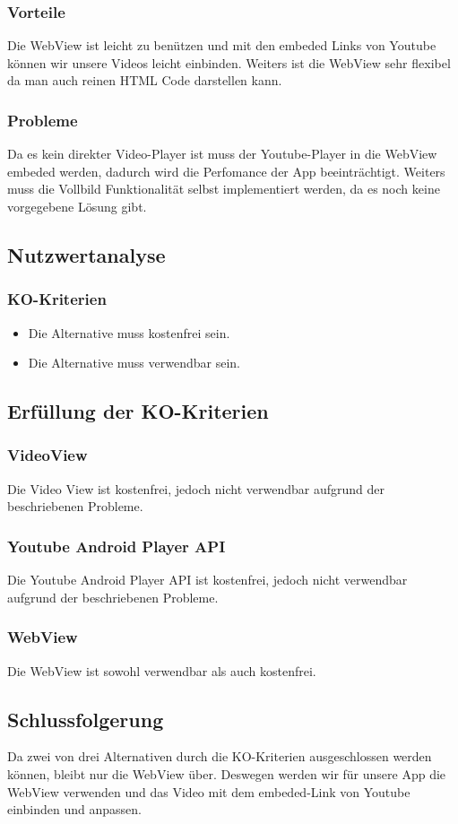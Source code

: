 \documentclass[FIPLY_base.tex]{subfiles}
\begin{document}
\subsubsection{Vorteile}
Die WebView ist leicht zu benützen und mit den embeded Links von Youtube können wir unsere Videos leicht einbinden. Weiters ist die WebView sehr flexibel da man auch reinen HTML Code darstellen kann.
\subsubsection{Probleme}
Da es kein direkter Video-Player ist muss der Youtube-Player in die WebView embeded werden, dadurch wird die Perfomance der App beeinträchtigt. Weiters muss die Vollbild Funktionalität selbst implementiert werden, da es noch keine vorgegebene Lösung gibt.


\subsection{Nutzwertanalyse}
\subsubsection{KO-Kriterien}
\begin{itemize}
\item Die Alternative muss kostenfrei sein.
\item Die Alternative muss verwendbar sein.
\end{itemize}
\subsection{Erfüllung der KO-Kriterien}
\subsubsection{VideoView}
Die Video View ist kostenfrei, jedoch nicht verwendbar aufgrund der beschriebenen Probleme.
\subsubsection{Youtube Android Player API}
Die Youtube Android Player API ist kostenfrei, jedoch nicht verwendbar aufgrund der beschriebenen Probleme.
\subsubsection{WebView}
Die WebView ist sowohl verwendbar als auch kostenfrei.
\subsection{Schlussfolgerung}
Da zwei von drei Alternativen durch die KO-Kriterien ausgeschlossen werden können, bleibt nur die WebView über. Deswegen werden wir für unsere App die WebView verwenden und das Video mit dem embeded-Link von Youtube einbinden und anpassen.
\end{document}
